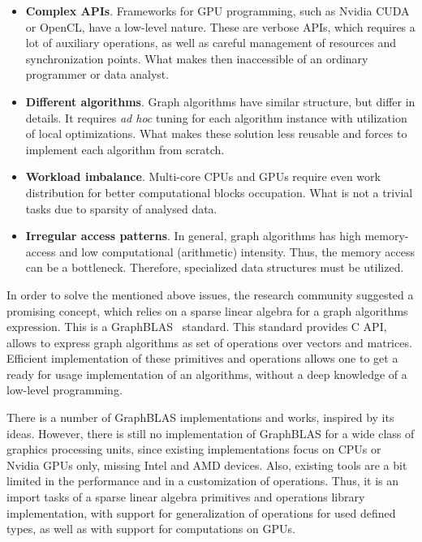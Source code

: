 \begin{itemize}
    \item \textbf{Complex APIs}. Frameworks for GPU programming, such as Nvidia CUDA or OpenCL, have a low-level nature. These are verbose APIs, which requires a lot of auxiliary operations, as well as careful management of resources and synchronization points. What makes then inaccessible of an ordinary programmer or data analyst.
    
    \item \textbf{Different algorithms}. Graph algorithms have similar structure, but differ in details. It requires \textit{ad hoc} tuning for each algorithm instance with utilization of local optimizations. What makes these solution less reusable and forces to implement each algorithm from scratch.
    
    \item \textbf{Workload imbalance}. Multi-core CPUs and GPUs require even work distribution for better computational blocks occupation. What is not a trivial tasks due to sparsity of analysed data.
    
    \item \textbf{Irregular access patterns}. In general, graph algorithms has high memory-access and low computational (arithmetic) intensity. Thus, the memory access can be a bottleneck. Therefore, specialized data structures must be utilized.
\end{itemize}

In order to solve the mentioned above issues, the research community suggested a promising concept, which relies on a sparse linear algebra for a graph algorithms expression. This is a GraphBLAS~\cite{paper:graphblas_foundations} standard. This standard provides C API, allows to express graph algorithms as set of operations over vectors and matrices. Efficient implementation of these primitives and operations allows one to get a ready for usage implementation of an algorithms, without a deep knowledge of a low-level programming.

There is a number of GraphBLAS implementations and works, inspired by its ideas. However, there is still no implementation of GraphBLAS for a wide class of graphics processing units, since existing implementations focus on CPUs or Nvidia GPUs only, missing Intel and AMD devices. Also, existing tools are a bit limited in the performance and in a customization of operations. Thus, it is an import tasks of a sparse linear algebra primitives and operations library implementation, with support for generalization of operations for used defined types, as well as with support for computations on GPUs.